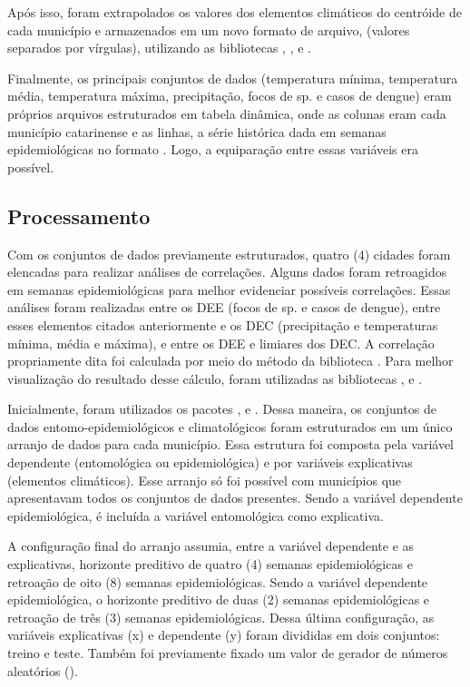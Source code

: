 \indent Após isso, foram extrapolados os valores dos elementos climáticos do centróide de cada município e armazenados em um novo formato de arquivo,  (valores separados por vírgulas), utilizando as bibliotecas , ,  e  \cite{shapely_2007_gillies}.

\indent Finalmente,  os principais conjuntos de dados (temperatura mínima, temperatura média, temperatura máxima, precipitação, focos de  sp. e casos de dengue) eram próprios arquivos estruturados em tabela dinâmica, onde as colunas eram cada município catarinense e as linhas, a série histórica dada em semanas epidemiológicas no formato . Logo, a equiparação entre essas variáveis era possível.

\subsection{Processamento}

\indent Com os conjuntos de dados previamente estruturados, quatro (4) cidades foram elencadas para realizar análises de correlações. Alguns dados foram retroagidos em semanas epidemiológicas para melhor evidenciar possíveis correlações. Essas análises foram realizadas entre os \acrshort{DEE} (focos de  sp. e casos de dengue), entre esses elementos citados anteriormente e os \acrshort{DEC} (precipitação e temperaturas mínima, média e máxima), e entre os \acrshort{DEE} e limiares dos \acrshort{DEC}. A correlação propriamente dita foi calculada por meio do método  da biblioteca . Para melhor visualização do resultado desse cálculo, foram utilizadas as bibliotecas ,  e .

\indent Inicialmente, foram utilizados os pacotes ,  e  \cite{scikit-learn_2011_pedregosa, sklearn_2013_buitinck}. Dessa maneira, os conjuntos de dados entomo-epidemiológicos e climatológicos foram estruturados em um único arranjo de dados para cada município. Essa estrutura foi composta pela variável dependente (entomológica ou epidemiológica) e por variáveis explicativas (elementos climáticos). Esse arranjo só foi possível com municípios que apresentavam todos os conjuntos de dados presentes. Sendo a variável dependente epidemiológica, é incluída a variável entomológica como explicativa.

\indent A configuração final do arranjo assumia, entre a variável dependente e as explicativas, horizonte preditivo de quatro (4) semanas epidemiológicas e retroação de oito (8) semanas epidemiológicas. Sendo a variável dependente epidemiológica, o horizonte preditivo de duas (2) semanas epidemiológicas e retroação de três (3) semanas epidemiológicas. Dessa última configuração, as variáveis explicativas (x) e dependente (y) foram divididas em dois conjuntos: treino e teste. Também foi previamente fixado um valor de gerador de números aleatórios ().

